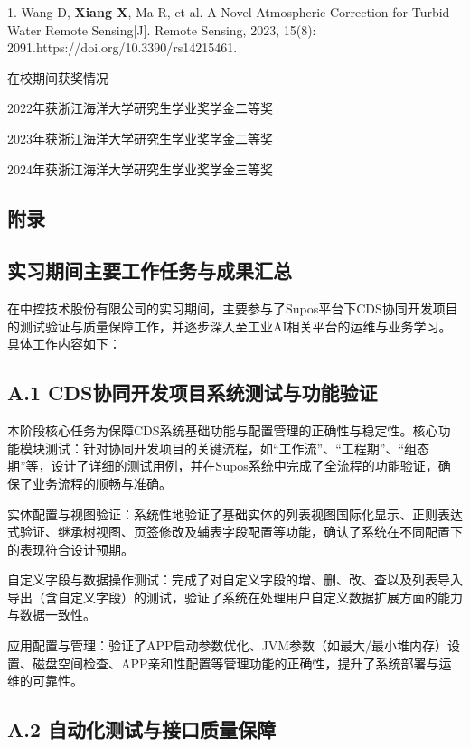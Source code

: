 \documentclass[
  12pt,
]{article}
\begin{document}
1. Wang D, \textbf{Xiang X}, Ma R, et al. A Novel Atmospheric Correction
for Turbid Water Remote Sensing{[}J{]}. Remote Sensing, 2023, 15(8):
2091.https://doi.org/10.3390/rs14215461.

在校期间获奖情况

2022年获浙江海洋大学研究生学业奖学金二等奖

2023年获浙江海洋大学研究生学业奖学金二等奖

2024年获浙江海洋大学研究生学业奖学金三等奖

\subsection{附录}\label{ux9644ux5f55}

\subsection{实习期间主要工作任务与成果汇总}\label{ux5b9eux4e60ux671fux95f4ux4e3bux8981ux5de5ux4f5cux4efbux52a1ux4e0eux6210ux679cux6c47ux603b}

在中控技术股份有限公司的实习期间，主要参与了Supos平台下CDS协同开发项目的测试验证与质量保障工作，并逐步深入至工业AI相关平台的运维与业务学习。具体工作内容如下：

\subsection{A.1
CDS协同开发项目系统测试与功能验证}\label{a.1-cdsux534fux540cux5f00ux53d1ux9879ux76eeux7cfbux7edfux6d4bux8bd5ux4e0eux529fux80fdux9a8cux8bc1}

本阶段核心任务为保障CDS系统基础功能与配置管理的正确性与稳定性。核心功能模块测试：针对协同开发项目的关键流程，如``工作流''、``工程期''、``组态期''等，设计了详细的测试用例，并在Supos系统中完成了全流程的功能验证，确保了业务流程的顺畅与准确。

实体配置与视图验证：系统性地验证了基础实体的列表视图国际化显示、正则表达式验证、继承树视图、页签修改及辅表字段配置等功能，确认了系统在不同配置下的表现符合设计预期。

自定义字段与数据操作测试：完成了对自定义字段的增、删、改、查以及列表导入导出（含自定义字段）的测试，验证了系统在处理用户自定义数据扩展方面的能力与数据一致性。

应用配置与管理：验证了APP启动参数优化、JVM参数（如最大/最小堆内存）设置、磁盘空间检查、APP亲和性配置等管理功能的正确性，提升了系统部署与运维的可靠性。

\subsection{A.2
自动化测试与接口质量保障}\label{a.2-ux81eaux52a8ux5316ux6d4bux8bd5ux4e0eux63a5ux53e3ux8d28ux91cfux4fddux969c}
\end{document}
